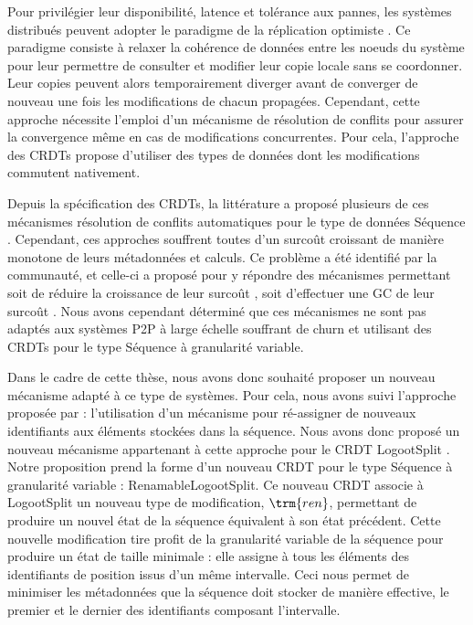 Pour privilégier leur disponibilité, latence et tolérance aux pannes, les systèmes distribués peuvent adopter le paradigme de la réplication optimiste \cite{2005-optimistic-replication-saito}.
Ce paradigme consiste à relaxer la cohérence de données entre les noeuds du système pour leur permettre de consulter et modifier leur copie locale sans se coordonner.
Leur copies peuvent alors temporairement diverger avant de converger de nouveau une fois les modifications de chacun propagées.
Cependant, cette approche nécessite l'emploi d'un mécanisme de résolution de conflits pour assurer la convergence même en cas de modifications concurrentes.
Pour cela, l'approche des \acp{CRDT} \cite{2007-crdt-shapiro,shapiro_2011_crdt} propose d'utiliser des types de données dont les modifications commutent nativement.

Depuis la spécification des \acp{CRDT}, la littérature a proposé plusieurs de ces mécanismes résolution de conflits automatiques pour le type de données Séquence \cite{2006-woot-oster,ROH2011354,2009-treedoc-preguica,2009-logoot-weiss}.
Cependant, ces approches souffrent toutes d'un surcoût croissant de manière monotone de leurs métadonnées et calculs.
Ce problème a été identifié par la communauté, et celle-ci a proposé pour y répondre des mécanismes permettant soit de réduire la croissance de leur surcoût \cite{lseq2013,lseq2017}, soit d'effectuer une \acf{GC} de leur surcoût \cite{ROH2011354,letia:hal-01248270,zawirski:hal-01248197}.
Nous avons cependant déterminé que ces mécanismes ne sont pas adaptés aux systèmes \ac{P2P} à large échelle souffrant de churn et utilisant des \acp{CRDT} pour le type Séquence à granularité variable.

Dans le cadre de cette thèse, nous avons donc souhaité proposer un nouveau mécanisme adapté à ce type de systèmes.
Pour cela, nous avons suivi l'approche proposée par \cite{letia:hal-01248270,zawirski:hal-01248197} : l'utilisation d'un mécanisme pour ré-assigner de nouveaux identifiants aux éléments stockées dans la séquence.
Nous avons donc proposé un nouveau mécanisme appartenant à cette approche pour le \ac{CRDT} LogootSplit \cite{2013-logootsplit}.\\

Notre proposition prend la forme d'un nouveau \ac{CRDT} pour le type Séquence à granularité variable : RenamableLogootSplit.
Ce nouveau \ac{CRDT} associe à LogootSplit un nouveau type de modification, $\trm{ren}$, permettant de produire un nouvel état de la séquence équivalent à son état précédent.
Cette nouvelle modification tire profit de la granularité variable de la séquence pour produire un état de taille minimale : elle assigne à tous les éléments des identifiants de position issus d'un même intervalle.
Ceci nous permet de minimiser les métadonnées que la séquence doit stocker de manière effective, \ie le premier et le dernier des identifiants composant l'intervalle.

